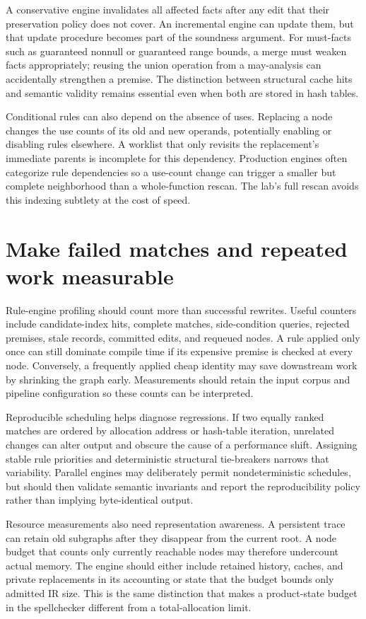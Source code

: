 A conservative engine invalidates all affected facts after any edit that their preservation policy does not cover.
An incremental engine can update them, but that update procedure becomes part of the soundness argument.
For must-facts such as guaranteed nonnull or guaranteed range bounds, a merge must weaken facts appropriately; reusing the union operation from a may-analysis can accidentally strengthen a premise.
The distinction between structural cache hits and semantic validity remains essential even when both are stored in hash tables.

Conditional rules can also depend on the absence of uses.
Replacing a node changes the use counts of its old and new operands, potentially enabling or disabling rules elsewhere.
A worklist that only revisits the replacement's immediate parents is incomplete for this dependency.
Production engines often categorize rule dependencies so a use-count change can trigger a smaller but complete neighborhood than a whole-function rescan.
The lab's full rescan avoids this indexing subtlety at the cost of speed.

\section{Make failed matches and repeated work measurable}
\label{sec:ch85-measurement}
Rule-engine profiling should count more than successful rewrites.
Useful counters include candidate-index hits, complete matches, side-condition queries, rejected premises, stale records, committed edits, and requeued nodes.
A rule applied only once can still dominate compile time if its expensive premise is checked at every node.
Conversely, a frequently applied cheap identity may save downstream work by shrinking the graph early.
Measurements should retain the input corpus and pipeline configuration so these counts can be interpreted.

Reproducible scheduling helps diagnose regressions.
If two equally ranked matches are ordered by allocation address or hash-table iteration, unrelated changes can alter output and obscure the cause of a performance shift.
Assigning stable rule priorities and deterministic structural tie-breakers narrows that variability.
Parallel engines may deliberately permit nondeterministic schedules, but should then validate semantic invariants and report the reproducibility policy rather than implying byte-identical output.

Resource measurements also need representation awareness.
A persistent trace can retain old subgraphs after they disappear from the current root.
A node budget that counts only currently reachable nodes may therefore undercount actual memory.
The engine should either include retained history, caches, and private replacements in its accounting or state that the budget bounds only admitted IR size.
This is the same distinction that makes a product-state budget in the spellchecker different from a total-allocation limit.

